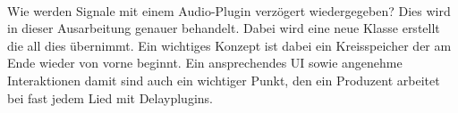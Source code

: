 \kurzfassung

\paragraph*{}
Wie werden Signale mit einem Audio-Plugin verzögert wiedergegeben? Dies wird in dieser Ausarbeitung genauer behandelt. Dabei wird eine neue Klasse erstellt die all dies übernimmt. Ein wichtiges Konzept ist dabei ein Kreisspeicher der am Ende wieder von vorne beginnt. 
Ein ansprechendes UI sowie angenehme Interaktionen damit sind auch ein wichtiger Punkt, den ein Produzent arbeitet bei fast jedem Lied mit Delayplugins.